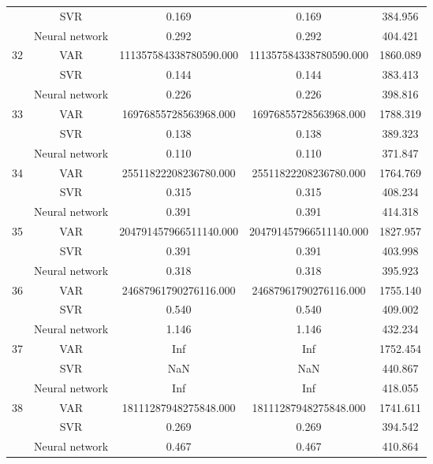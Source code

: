 \documentclass[12pt]{article}
\begin{document}
\begin{longtable}{|p{2cm}|c|c|c|c|}
\cline{2-5}
 &SVR &   0.169 &    0.169 &    384.956\\
\cline{2-5}
 &Neural network &   0.292 &    0.292 &    404.421\\
\cline{2-5}
\hline
\multirow{3}{*}{32} &VAR &   111357584338780590.000 &    111357584338780590.000 &    1860.089\\
\cline{2-5}
 &SVR &   0.144 &    0.144 &    383.413\\
\cline{2-5}
 &Neural network &   0.226 &    0.226 &    398.816\\
\cline{2-5}
\hline
\multirow{3}{*}{33} &VAR &   16976855728563968.000 &    16976855728563968.000 &    1788.319\\
\cline{2-5}
 &SVR &   0.138 &    0.138 &    389.323\\
\cline{2-5}
 &Neural network &   0.110 &    0.110 &    371.847\\
\cline{2-5}
\hline
\multirow{3}{*}{34} &VAR &   25511822208236780.000 &    25511822208236780.000 &    1764.769\\
\cline{2-5}
 &SVR &   0.315 &    0.315 &    408.234\\
\cline{2-5}
 &Neural network &   0.391 &    0.391 &    414.318\\
\cline{2-5}
\hline
\multirow{3}{*}{35} &VAR &   204791457966511140.000 &    204791457966511140.000 &    1827.957\\
\cline{2-5}
 &SVR &   0.391 &    0.391 &    403.998\\
\cline{2-5}
 &Neural network &   0.318 &    0.318 &    395.923\\
\cline{2-5}
\hline
\multirow{3}{*}{36} &VAR &   24687961790276116.000 &    24687961790276116.000 &    1755.140\\
\cline{2-5}
 &SVR &   0.540 &    0.540 &    409.002\\
\cline{2-5}
 &Neural network &   1.146 &    1.146 &    432.234\\
\cline{2-5}
\hline
\multirow{3}{*}{37} &VAR &   Inf &    Inf &    1752.454\\
\cline{2-5}
 &SVR &   NaN &    NaN &    440.867\\
\cline{2-5}
 &Neural network &   Inf &    Inf &    418.055\\
\cline{2-5}
\hline
\multirow{3}{*}{38} &VAR &   18111287948275848.000 &    18111287948275848.000 &    1741.611\\
\cline{2-5}
 &SVR &   0.269 &    0.269 &    394.542\\
\cline{2-5}
 &Neural network &   0.467 &    0.467 &    410.864\\

\end{longtable}
\end{document}

